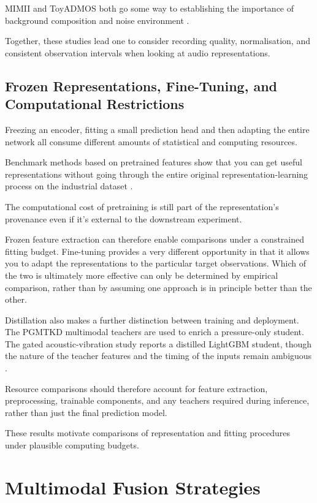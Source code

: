 MIMII and ToyADMOS both go some way to establishing the importance of background composition and
noise environment \parencite{purohit_mimii_2019,koizumi_toyadmos_2019}.

Together, these studies lead one to consider recording quality, normalisation, and consistent
observation intervals when looking at audio representations.

\subsection{Frozen Representations, Fine-Tuning, and Computational Restrictions}

Freezing an encoder, fitting a small prediction head and then adapting the entire network all
consume different amounts of statistical and computing resources.

Benchmark methods based on pretrained features show that you can get useful representations without
going through the entire original representation-learning process on the industrial dataset
\parencite{roth_towards_2022,costanzino_multimodal_2024}.

The computational cost of pretraining is still part of the representation's provenance even if it's
external to the downstream experiment.

Frozen feature extraction can therefore enable comparisons under a constrained fitting budget.
Fine-tuning provides a very different opportunity in that it allows you to adapt the representations
to the particular target observations. Which of the two is ultimately more effective can only be
determined by empirical comparison, rather than by assuming one approach is in principle better than
the other.

Distillation also makes a further distinction between training and deployment. The PGMTKD multimodal
teachers are used to enrich a pressure-only student. The gated acoustic-vibration study reports a
distilled LightGBM student, though the nature of the teacher features and the timing of the inputs
remain ambiguous \parencite{li_pgmtkd_2025,huang_rolling_2026}.

Resource comparisons should therefore account for feature extraction, preprocessing, trainable
components, and any teachers required during inference, rather than just the final prediction model.

These results motivate comparisons of representation and fitting procedures under plausible computing budgets.

\section{Multimodal Fusion Strategies}

